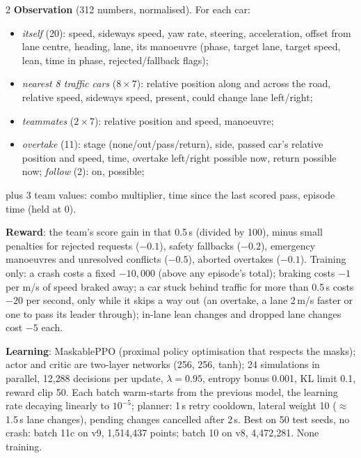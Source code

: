 \documentclass[10pt]{article}
\begin{document}
\begin{multicols}{2}
\textbf{Observation} (312 numbers, normalised). For each car:
\begin{itemize}
\item \emph{itself} (20): speed, sideways speed, yaw rate, steering, acceleration, offset from lane centre, heading,
lane, its manoeuvre (phase, target lane, target speed, lean, time in phase, rejected/fallback flags);
\item \emph{nearest 8 traffic cars} ($8\times7$): relative position along and across the road, relative speed,
sideways speed, present, could change lane left/right;
\item \emph{teammates} ($2\times7$): relative position and speed, manoeuvre;
\item \emph{overtake} (11): stage (none/out/pass/return), side, passed car's relative position and speed, time,
overtake left/right possible now, return possible now; \emph{follow} (2): on, possible;
\end{itemize}
plus 3 team values: combo multiplier, time since the last scored pass, episode time (held at 0).

\textbf{Reward}: the team's score gain in that 0.5\,s (divided by 100), minus small penalties for rejected requests
($-0.1$), safety fallbacks ($-0.2$), emergency manoeuvres and unresolved conflicts ($-0.5$), aborted overtakes ($-0.1$).
Training only: a crash costs a fixed $-10{,}000$ (above any episode's total); braking costs $-1$ per m/s of speed
braked away; a car stuck behind traffic for more than 0.5\,s costs $-20$ per second, only while it skips a way out
(an overtake, a lane 2\,m/s faster or one to pass its leader through); in-lane lean changes and dropped lane changes
cost $-5$ each.

\textbf{Learning}: MaskablePPO (proximal policy optimisation that respects the masks); actor and critic are
two-layer networks (256, 256, tanh); 24 simulations in parallel, 12{,}288 decisions per update, $\lambda=0.95$,
entropy bonus 0.001, KL limit 0.1, reward clip 50. Each batch warm-starts from the previous
model, the learning rate decaying linearly to $10^{-5}$; planner: 1\,s retry cooldown, lateral weight 10
($\approx$1.5\,s lane changes), pending changes cancelled after 2\,s. Best on 50 test seeds, no crash: batch 11c
on v9, 1{,}514{,}437 points; batch 10 on v8, 4{,}472{,}281. None training.


\end{multicols}
\end{document}
